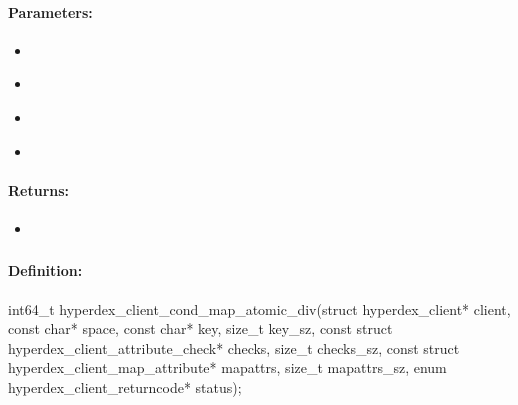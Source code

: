 \paragraph{Parameters:}
\begin{itemize}[noitemsep]
\item {}\\

\item {}\\

\item {}\\

\item {}\\

\end{itemize}

\paragraph{Returns:}
\begin{itemize}[noitemsep]
\item {}\\

\end{itemize}

\pagebreak
\subsubsection{}
\label{api:c:cond_map_atomic_div}


\paragraph{Definition:}
\begin{ccode}
int64_t hyperdex_client_cond_map_atomic_div(struct hyperdex_client* client,
        const char* space,
        const char* key, size_t key_sz,
        const struct hyperdex_client_attribute_check* checks, size_t checks_sz,
        const struct hyperdex_client_map_attribute* mapattrs, size_t mapattrs_sz,
        enum hyperdex_client_returncode* status);
\end{ccode}


